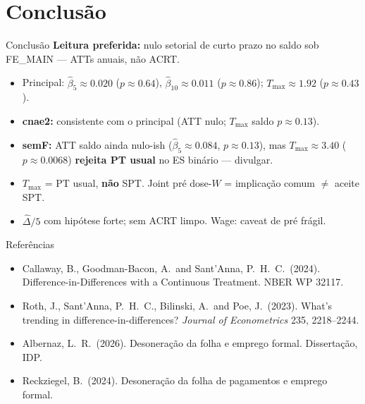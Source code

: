 \documentclass[aspectratio=169,11pt]{beamer}
\begin{document}
\section{Conclusão}
\begin{frame}{Conclusão}
\textbf{Leitura preferida:} nulo setorial de curto prazo no saldo sob FE\_MAIN --- ATTs anuais, não ACRT.
\begin{itemize}
  \item Principal: \(\hat\beta_5\approx 0.020\) (\(p\approx 0.64\)), \(\hat\beta_{10}\approx 0.011\) (\(p\approx 0.86\)); \(T_{\max}\approx 1.92\) (\(p\approx 0.43\)).
  \item \textbf{cnae2:} consistente com o principal (ATT nulo; \(T_{\max}\) saldo \(p\approx 0.13\)).
  \item \textbf{semF:} ATT saldo ainda nulo-ish (\(\hat\beta_5\approx 0.084\), \(p\approx 0.13\)), mas \(T_{\max}\approx 3.40\) (\(p\approx 0.0068\)) \textbf{rejeita PT usual} no ES binário --- divulgar.
  \item \(T_{\max}\) = PT usual, \textbf{não} SPT. Joint pré dose-\(W\) = implicação comum \(\neq\) aceite SPT.
  \item \(\widehat{\Delta}/5\) com hipótese forte; sem ACRT limpo. Wage: caveat de pré frágil.
\end{itemize}
\end{frame}

\begin{frame}{Referências}
\footnotesize
\begin{itemize}
  \item Callaway, B., Goodman-Bacon, A.\ and Sant'Anna, P.\ H.\ C.\ (2024).
        Difference-in-Differences with a Continuous Treatment. NBER WP 32117.
  \item Roth, J., Sant'Anna, P.\ H.\ C., Bilinski, A.\ and Poe, J.\ (2023).
        What's trending in difference-in-differences?
        \emph{Journal of Econometrics} 235, 2218--2244.
  \item Albernaz, L.\ R.\ (2026). Desoneração da folha e emprego formal. Dissertação, IDP.
  \item Reckziegel, B.\ (2024). Desoneração da folha de pagamentos e emprego formal.
\end{itemize}
\end{frame}

\appendix
\end{document}
